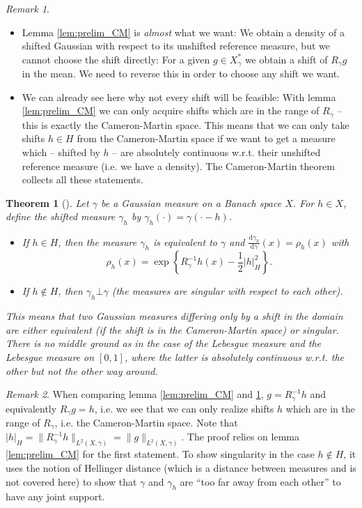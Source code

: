 \documentclass{scrartcl}
\newtheorem{theorem}{Theorem}
\theoremstyle{definition}
\theoremstyle{remark}
\newtheorem{remark}{Remark}
\newcommand{\de}{\mathrm d}
\begin{document}
\begin{remark}
\begin{itemize}
\item Lemma \ref{lem:prelim_CM} is \textit{almost} what we want: We obtain a density of a shifted Gaussian with respect to its unshifted reference measure, but we cannot choose the shift directly: For a given $g\in X_\gamma^*$ we obtain a shift of $R_\gamma g$ in the mean. We need to reverse this in order to choose any shift we want. 
\item We can already see here why not every shift will be feasible: With lemma \ref{lem:prelim_CM} we can only acquire shifts which are in the range of $R_\gamma$ -- this is exactly the Cameron-Martin space. This means that we can only take shifts $h\in H$ from the Cameron-Martin space if we want to get a measure which -- shifted by $h$ -- are absolutely continuous w.r.t. their unshifted reference measure (i.e. we have a density). The Cameron-Martin theorem collects all these statements.
\end{itemize} 
\end{remark}
\begin{theorem}[{\cite[Theorem 3.1.5]{Lunardi}}]\label{thm:CM}
Let $\gamma$ be a Gaussian measure on a Banach space $X$. For $h\in X$, define the shifted measure $\gamma_h$ by $\gamma_h(\cdot) = \gamma(\cdot - h)$.
\begin{itemize}
\item If $h\in H$, then the measure $\gamma_h$ is equivalent to $\gamma$ and $\frac{\de \gamma_h}{\de \gamma }(x) = \rho_h(x)$ with
\[\rho_h(x) = \exp\left\{R_\gamma^{-1} h(x) - \frac{1}{2}|h|_H^2\right\}.\]
\item If $h\not\in H$, then $\gamma_h \bot \gamma$ (the measures are singular with respect to each other).
\end{itemize}
This means that two Gaussian measures differing only by a shift in the domain are either equivalent (if the shift is in the Cameron-Martin space) or singular. There is no middle ground as in the case of the Lebesgue measure and the Lebesgue measure on $[0,1]$, where the latter is absolutely continuous w.r.t. the other but not the other way around.
\end{theorem}
\begin{remark}
When comparing lemma \ref{lem:prelim_CM} and \ref{thm:CM}, $g = R_\gamma^{-1} h$ and equivalently $R_\gamma g = h$, i.e. we see that we can only realize shifts $h$ which are in the range of $R_\gamma$, i.e. the Cameron-Martin space. Note that $|h|_H = \|R_\gamma^{-1} h\|_{L^2(X,\gamma)} = \|g\|_{L^2(X,\gamma)}$. The proof relies on lemma \ref{lem:prelim_CM} for the first statement. To show singularity in the case $h\not\in H$, it uses the notion of Hellinger distance (which is a distance between measures and is not covered here) to show that $\gamma$ and $\gamma_h$ are ``too far away from each other'' to have any joint support.
\end{remark}
\end{document}
